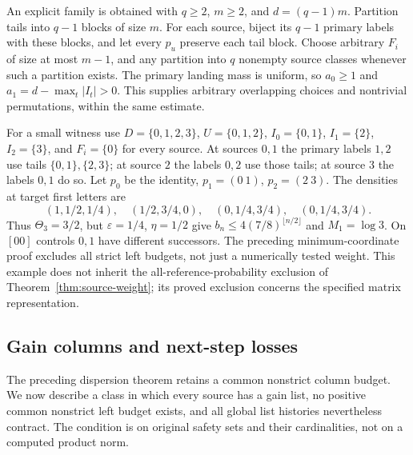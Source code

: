 \documentclass[11pt,reqno]{amsart}
\numberwithin{equation}{section}
\theoremstyle{definition}
\newcommand{\eps}{\varepsilon}
\begin{document}
An explicit family is obtained with $q\ge2$, $m\ge2$, and
$d=(q-1)m$. Partition tails into $q-1$ blocks of size $m$.
For each source, biject its $q-1$ primary labels with these blocks,
and let every $p_u$ preserve each tail block. Choose arbitrary
$F_i$ of size at most $m-1$, and any partition into $q$ nonempty
source classes whenever such a partition exists. The primary
landing mass is uniform, so $a_0\ge1$ and
$a_1=d-\max_t|I_t|>0$. This supplies arbitrary overlapping
choices and nontrivial permutations, within the same estimate.

For a small witness use $D=\{0,1,2,3\}$, $U=\{0,1,2\}$,
$I_0=\{0,1\}$, $I_1=\{2\}$, $I_2=\{3\}$, and
$F_i=\{0\}$ for every source. At sources $0,1$ the primary
labels $1,2$ use tails $\{0,1\},\{2,3\}$; at source $2$ the
labels $0,2$ use those tails; at source $3$ the labels $0,1$ do so.
Let $p_0$ be the identity, $p_1=(0\ 1)$, $p_2=(2\ 3)$.
The densities at target first letters are
\[
 (1,1/2,1/4),\quad(1/2,3/4,0),\quad
 (0,1/4,3/4),\quad(0,1/4,3/4).
\]
Thus $\Theta_3=3/2$, but $\eps=1/4$, $\eta=1/2$ give
$b_n\le4(7/8)^{\lfloor n/2\rfloor}$ and $M_1=\log3$.
On $[00]$ controls $0,1$ have different successors. The preceding
minimum-coordinate proof excludes all strict left budgets, not
just a numerically tested weight. This example does not inherit
the all-reference-probability exclusion of
Theorem~\ref{thm:source-weight}; its proved exclusion concerns
the specified matrix representation.


\subsection{Gain columns and next-step losses}\label{sec:gainloss}

The preceding dispersion theorem retains a common nonstrict column
budget. We now describe a class in which every source has a gain
list, no positive common nonstrict left budget exists, and all global
list histories nevertheless contract. The condition is on original
safety sets and their cardinalities, not on a computed product norm.
\end{document}
